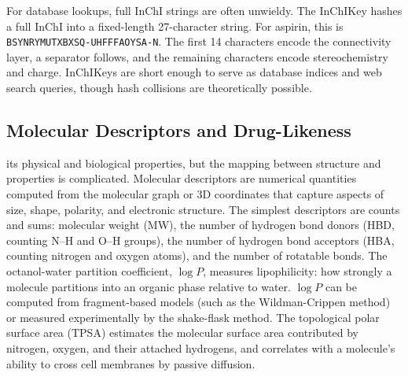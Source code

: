 For database lookups, full InChI strings are often unwieldy. The InChIKey hashes a full InChI into a fixed-length 27-character string. For aspirin, this is \texttt{BSYNRYMUTXBXSQ-UHFFFAOYSA-N}. The first 14 characters encode the connectivity layer, a separator follows, and the remaining characters encode stereochemistry and charge. InChIKeys are short enough to serve as database indices and web search queries, though hash collisions are theoretically possible.


\subsection{Molecular Descriptors and Drug-Likeness}
\label{sec:descriptors}

 its physical and biological properties, but the mapping between structure and properties is complicated. Molecular descriptors are numerical quantities computed from the molecular graph or 3D coordinates that capture aspects of size, shape, polarity, and electronic structure. The simplest descriptors are counts and sums: molecular weight (MW), the number of hydrogen bond donors (HBD, counting N--H and O--H groups), the number of hydrogen bond acceptors (HBA, counting nitrogen and oxygen atoms), and the number of rotatable bonds. The octanol-water partition coefficient, $\log P$, measures lipophilicity: how strongly a molecule partitions into an organic phase relative to water. $\log P$ can be computed from fragment-based models (such as the Wildman-Crippen method) or measured experimentally by the shake-flask method. The topological polar surface area (TPSA) estimates the molecular surface area contributed by nitrogen, oxygen, and their attached hydrogens, and correlates with a molecule's ability to cross cell membranes by passive diffusion.

